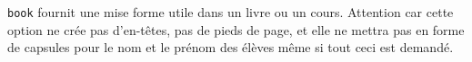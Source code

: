 %

\verb+book+ fournit une mise forme utile dans un livre ou un cours. Attention car cette option ne crée pas d'en-têtes, pas de pieds de page, et elle ne mettra pas en forme de capsules pour le nom et le prénom des élèves même si tout ceci est demandé.
